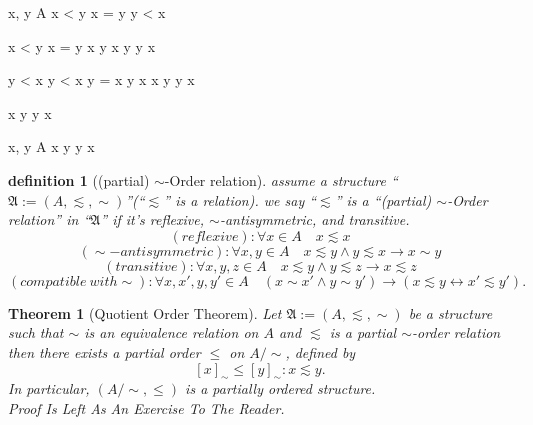 \documentclass[10pt,a4paper]{book}
\newtheorem{definition}{definition}[section]
\newtheorem{theorem}{Theorem}[section]
\begin{document}
\begin{fitchproof}[arrayenv=tabular]

    \open
     {x, y \in A} 
     {x < y \lor x = y \lor y < x} 

    \open
     {x < y \lor x = y} 
     {x \preceq y} 
     {x \preceq y \lor y \preceq x} 
    \close

    \open
     {y < x} 
     {y < x \lor y = x} 
     {y \preceq x} 
     {x \preceq y \lor y \preceq x} 
    \close

     {x \preceq y \lor y \preceq x} 
    \close

     {\forall x, y \in A \quad x \preceq y \lor y \preceq x} 

\end{fitchproof}


\begin{definition}[(partial) $\sim$-Order relation]
     assume  a structure ``$\mathfrak{A} := (A , \lesssim  , \sim  ) $''(``$\lesssim  $'' is a relation).
    we say ``$\lesssim   $''
    is a ``(partial) $\sim$-Order relation'' in  ``$\mathfrak{A}$'' if it's  reflexive, $\sim$-antisymmetric, and transitive.
    \[ (reflexive) :  \forall x \in A \quad x \lesssim  x \]
    \[ (\sim-antisymmetric) :   \forall x,y \in A \quad x \lesssim  y \land y \lesssim  x \to x \sim y \]
    \[ (transitive) :  \forall x,y,z \in A \quad x \lesssim  y \land y \lesssim  z \to x \lesssim  z  \]
    \[ (compatible \ with \sim) :   \forall x,x',y,y'\in A \quad (x\sim x'\land y\sim y') \to (x\lesssim y  \leftrightarrow x'\lesssim y'). \]

\end{definition}


\begin{theorem}[Quotient Order Theorem]
    Let $\mathfrak{A}:=(A,\lesssim,\sim)$ be a structure such that
    $\sim$ is an equivalence relation on $A$ and $\lesssim$
    is a partial $\sim$-order relation then there exists a partial order $\leq$ on $A/{\sim}$,
    defined by
    \[
        [x]_{\sim}\leq [y]_{\sim}
        : x\lesssim y.
    \]
    In particular, $(A/{\sim},\leq)$ is a partially ordered structure.
    \\
    Proof Is Left As An Exercise To The Reader.
\end{theorem}
\end{document}
